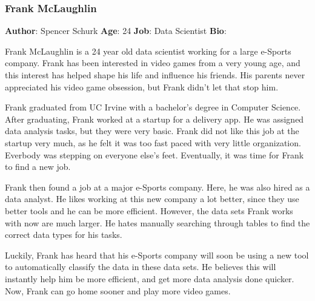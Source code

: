 \documentclass[12pt,oneside,letterpaper]{article}
\begin{document}
\subsubsection{Frank McLaughlin}
\textbf{Author}: Spencer Schurk\newline
\textbf{Age}: 24\newline
\textbf{Job}: Data Scientist\newline
\textbf{Bio}:\newline
\par Frank McLaughlin is a 24 year old data scientist working for a large e-Sports company. Frank has been interested in video games from a very young age, and this interest has helped shape his life and influence his friends. His parents never appreciated his video game obsession, but Frank didn't let that stop him.
\par Frank graduated from UC Irvine with a bachelor's degree in Computer Science. After graduating, Frank worked at a startup for a delivery app. He was assigned data analysis tasks, but they were very basic. Frank did not like this job at the startup very much, as he felt it was too fast paced with very little organization. Everbody was stepping on everyone else's feet. Eventually, it was time for Frank to find a new job.
\par Frank then found a job at a major e-Sports company. Here, he was also hired as a data analyst. He likes working at this new company a lot better, since they use better tools and he can be more efficient. However, the data sets Frank works with now are much larger. He hates manually searching through tables to find the correct data types for his tasks.
\par Luckily, Frank has heard that his e-Sports company will soon be using a new tool to automatically classify the data in these data sets. He believes this will instantly help him be more efficient, and get more data analysis done quicker. Now, Frank can go home sooner and play more video games.\newline
\end{document}
